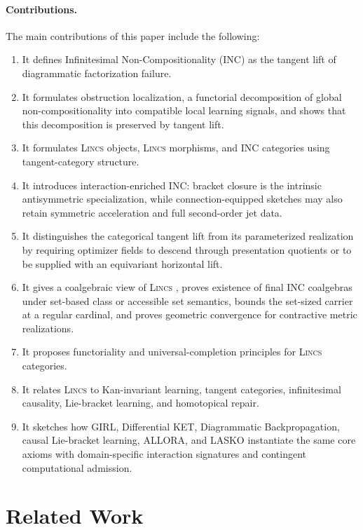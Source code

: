 \documentclass{article}
\begin{document}
\paragraph{Contributions.}
The main contributions of this paper include the following: 
\begin{enumerate}[leftmargin=2em]
  \item It defines Infinitesimal Non-Compositionality (INC) as the tangent lift of diagrammatic factorization failure.
  \item It formulates obstruction localization, a functorial decomposition of global non-compositionality into compatible local learning signals, and shows that this decomposition is preserved by tangent lift.
  \item It formulates \textsc{Lincs}   objects, \textsc{Lincs}   morphisms, and INC categories using tangent-category structure.
  \item It introduces interaction-enriched INC: bracket closure is the intrinsic antisymmetric specialization, while connection-equipped sketches may also retain symmetric acceleration and full second-order jet data.
  \item It distinguishes the categorical tangent lift from its parameterized realization by requiring optimizer fields to descend through presentation quotients or to be supplied with an equivariant horizontal lift.
  \item It gives a coalgebraic view of \textsc{Lincs}  , proves existence of final INC coalgebras under set-based class or accessible set semantics, bounds the set-sized carrier at a regular cardinal, and proves geometric convergence for contractive metric realizations.
  \item It proposes functoriality and universal-completion principles for \textsc{Lincs}   categories.
  \item It relates \textsc{Lincs}   to Kan-invariant learning, tangent categories, infinitesimal causality, Lie-bracket learning, and homotopical repair.
  \item It sketches how GIRL, Differential KET, Diagrammatic Backpropagation, causal Lie-bracket learning, ALLORA, and LASKO instantiate the same core axioms with domain-specific interaction signatures and contingent computational admission.
\end{enumerate}

\section{Related Work}
\end{document}
